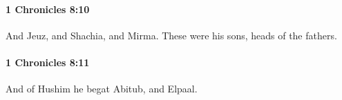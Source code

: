 		\paragraph{1 Chronicles 8:10} %
			\label{1CHRONICLES-8-10}

			And Jeuz, and Shachia, and Mirma. These were his sons, heads of the fathers.


		\paragraph{1 Chronicles 8:11} %
			\label{1CHRONICLES-8-11}

			And of Hushim he begat Abitub, and Elpaal.


